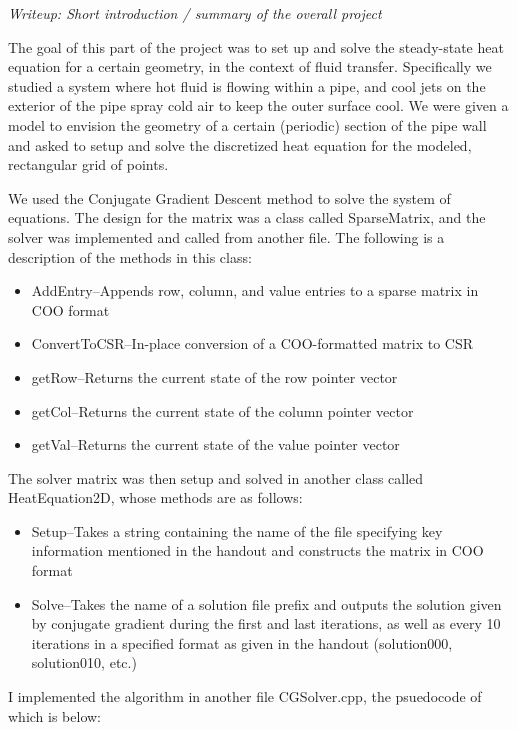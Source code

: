 \documentclass{article}
\begin{document}
\emph{Writeup: Short introduction / summary of the overall project}

The goal of this part of the project was to set up and solve the steady-state heat equation for a certain geometry, in the context of fluid transfer.  Specifically we studied a system where hot fluid is flowing within a pipe, and cool jets on the exterior of the pipe spray cold air to keep the outer surface cool.  We were given a model to envision the geometry of a certain (periodic) section of the pipe wall and asked to setup and solve the discretized heat equation for the modeled, rectangular grid of points.  

We used the Conjugate Gradient Descent method to solve the system of equations. The design for the matrix was a class called SparseMatrix, and the solver was implemented and called from another file.  The following is a description of the methods in this class:
\begin{itemize}
\item AddEntry--Appends row, column, and value entries to a sparse matrix in COO format
\item ConvertToCSR--In-place conversion of a COO-formatted matrix to CSR
\item getRow--Returns the current state of the row pointer vector
\item getCol--Returns the current state of the column pointer vector
\item getVal--Returns the current state of the value pointer vector
\end{itemize}

The solver matrix was then setup and solved in another class called HeatEquation2D, whose methods are as follows:
\begin{itemize}
\item Setup--Takes a string containing the name of the file specifying key information mentioned in the handout and constructs the matrix in COO format
\item Solve--Takes the name of a solution file prefix and outputs the solution given by conjugate gradient during the first and last iterations, as well as every 10 iterations in a specified format as given in the handout (solution000, solution010, etc.)
\end{itemize}
I implemented the algorithm in another file CGSolver.cpp, the psuedocode of which is below:
\end{document}
